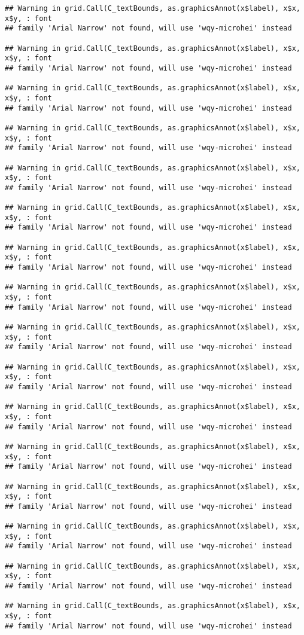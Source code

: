 \documentclass[
]{article}
\begin{document}
\begin{verbatim}
## Warning in grid.Call(C_textBounds, as.graphicsAnnot(x$label), x$x, x$y, : font
## family 'Arial Narrow' not found, will use 'wqy-microhei' instead

## Warning in grid.Call(C_textBounds, as.graphicsAnnot(x$label), x$x, x$y, : font
## family 'Arial Narrow' not found, will use 'wqy-microhei' instead

## Warning in grid.Call(C_textBounds, as.graphicsAnnot(x$label), x$x, x$y, : font
## family 'Arial Narrow' not found, will use 'wqy-microhei' instead

## Warning in grid.Call(C_textBounds, as.graphicsAnnot(x$label), x$x, x$y, : font
## family 'Arial Narrow' not found, will use 'wqy-microhei' instead

## Warning in grid.Call(C_textBounds, as.graphicsAnnot(x$label), x$x, x$y, : font
## family 'Arial Narrow' not found, will use 'wqy-microhei' instead

## Warning in grid.Call(C_textBounds, as.graphicsAnnot(x$label), x$x, x$y, : font
## family 'Arial Narrow' not found, will use 'wqy-microhei' instead

## Warning in grid.Call(C_textBounds, as.graphicsAnnot(x$label), x$x, x$y, : font
## family 'Arial Narrow' not found, will use 'wqy-microhei' instead

## Warning in grid.Call(C_textBounds, as.graphicsAnnot(x$label), x$x, x$y, : font
## family 'Arial Narrow' not found, will use 'wqy-microhei' instead

## Warning in grid.Call(C_textBounds, as.graphicsAnnot(x$label), x$x, x$y, : font
## family 'Arial Narrow' not found, will use 'wqy-microhei' instead

## Warning in grid.Call(C_textBounds, as.graphicsAnnot(x$label), x$x, x$y, : font
## family 'Arial Narrow' not found, will use 'wqy-microhei' instead

## Warning in grid.Call(C_textBounds, as.graphicsAnnot(x$label), x$x, x$y, : font
## family 'Arial Narrow' not found, will use 'wqy-microhei' instead

## Warning in grid.Call(C_textBounds, as.graphicsAnnot(x$label), x$x, x$y, : font
## family 'Arial Narrow' not found, will use 'wqy-microhei' instead

## Warning in grid.Call(C_textBounds, as.graphicsAnnot(x$label), x$x, x$y, : font
## family 'Arial Narrow' not found, will use 'wqy-microhei' instead

## Warning in grid.Call(C_textBounds, as.graphicsAnnot(x$label), x$x, x$y, : font
## family 'Arial Narrow' not found, will use 'wqy-microhei' instead

## Warning in grid.Call(C_textBounds, as.graphicsAnnot(x$label), x$x, x$y, : font
## family 'Arial Narrow' not found, will use 'wqy-microhei' instead

## Warning in grid.Call(C_textBounds, as.graphicsAnnot(x$label), x$x, x$y, : font
## family 'Arial Narrow' not found, will use 'wqy-microhei' instead
\end{verbatim}
\end{document}
